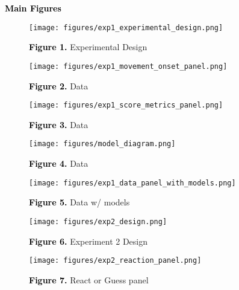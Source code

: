 \documentclass[12pt,letterpaper]{article}
\newcommand{\SethCaption}[2]{\noindent\textbf{\textcolor{black}{#1}} {#2}}
\newcommand{\SectionHeader}[1]{\noindent\textbf{\Large{\textcolor{black}{#1}}}\normalsize }
\begin{document}
\SectionHeader{Main Figures} 

\begin{figure}[H]
    \centering
    \texttt{[image: figures/exp1\_experimental\_design.png]}
    
    \SethCaption{Figure 1.}{Experimental Design}
\end{figure}
\begin{figure}[H]
    \centering
    \texttt{[image: figures/exp1\_movement\_onset\_panel.png]}
    
    \SethCaption{Figure 2.}{Data}
\end{figure}
\begin{figure}[H]
    \centering
    \texttt{[image: figures/exp1\_score\_metrics\_panel.png]}
    
    \SethCaption{Figure 3.}{Data}
\end{figure}

\begin{figure}[H]
    \centering
    \texttt{[image: figures/model\_diagram.png]}
    
    \SethCaption{Figure 4.}{Data}
\end{figure}
\begin{figure}[H]
    \centering
    \texttt{[image: figures/exp1\_data\_panel\_with\_models.png]}
    
    \SethCaption{Figure 5.}{Data w/ models}
\end{figure}

\begin{figure}[H]
    \centering
    \texttt{[image: figures/exp2\_design.png]}
    
    \SethCaption{Figure 6.}{Experiment 2 Design}
\end{figure}

\begin{figure}[H]
    \centering
    \texttt{[image: figures/exp2\_reaction\_panel.png]}
    
    \SethCaption{Figure 7.}{React or Guess panel}
\end{figure}
\end{document}
